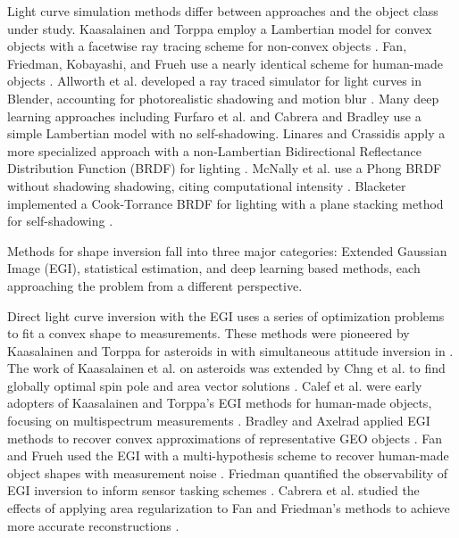 Light curve simulation methods differ between approaches and the object class under study. Kaasalainen and Torppa employ a Lambertian model for convex objects with a facetwise ray tracing scheme for non-convex objects \cite{kaasalainen2001}. Fan, Friedman, Kobayashi, and Frueh use a nearly identical scheme for human-made objects \cite{fan2016, fan2020thesis,friedman2020,kobayashi2020,frueh2014}. Allworth et al. developed a ray traced simulator for light curves in Blender, accounting for photorealistic shadowing and motion blur \cite{allworth2020, allworth2021}. Many deep learning approaches including Furfaro et al. \cite{furfaro2019} and Cabrera and Bradley \cite{cabrera2021,bradley2014} use a simple Lambertian model with no self-shadowing. Linares and Crassidis apply a more specialized approach with a non-Lambertian Bidirectional Reflectance Distribution Function (BRDF) for lighting \cite{linares2018space}. McNally et al. use a Phong BRDF without shadowing shadowing, citing computational intensity \cite{mcnally2021}. Blacketer implemented a Cook-Torrance BRDF for lighting with a plane stacking method for self-shadowing \cite{blacketer2022}.

Methods for shape inversion fall into three major categories: Extended Gaussian Image (EGI), statistical estimation, and deep learning based methods, each approaching the problem from a different perspective.

Direct light curve inversion with the EGI uses a series of optimization problems to fit a convex shape to measurements. These methods were pioneered by Kaasalainen and Torppa for asteroids in \cite{kaas2001shape} with simultaneous attitude inversion in \cite{kaasalainen2001}. The work of Kaasalainen et al. on asteroids was extended by Chng et al. to find globally optimal spin pole and area vector solutions \cite{chng2022}. Calef et al. were early adopters of Kaasalainen and Torppa's EGI methods for human-made objects, focusing on multispectrum measurements \cite{calef2006photometric}. Bradley and Axelrad applied EGI methods to recover convex approximations of representative GEO objects \cite{bradley2014}. Fan and Frueh used the EGI with a multi-hypothesis scheme to recover human-made object shapes with measurement noise \cite{fan2019, fan2020thesis, fan2021}. Friedman quantified the observability of EGI inversion to inform sensor tasking schemes \cite{friedman2020, friedman2022}. Cabrera et al. studied the effects of applying area regularization to Fan and Friedman's methods to achieve more accurate reconstructions \cite{cabrera2021}.

